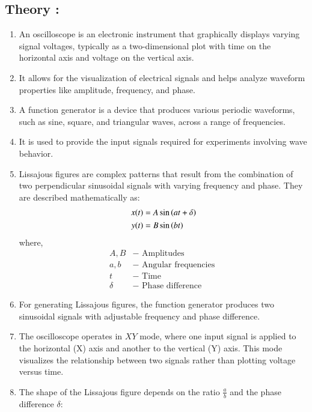 \documentclass[report]{IEEEtran}
\begin{document}
\subsection{Theory : }
\begin{enumerate}
    \item An \color{blue} oscilloscope \color{black} is an electronic instrument that graphically displays varying signal voltages, typically as a two-dimensional plot with time on the horizontal axis and voltage on the vertical axis. 
    \item It allows for the visualization of electrical signals and helps analyze waveform properties like amplitude, frequency, and phase.
    \item A \color{blue} function generator \color{black} is a device that produces various periodic waveforms, such as sine, square, and triangular waves, across a range of frequencies. 
    \item It is used to provide the input signals required for experiments involving wave behavior.
    \item \color{blue} Lissajous figures \color{black} are complex patterns that result from the combination of two perpendicular sinusoidal signals with varying frequency and phase. They are described mathematically as:
    \begin{align}
        x(t) &= A \sin \left(at + \delta\right) \\
        y(t) &= B \sin \left(bt\right)
    \end{align}
    where, 
    \begin{align*}
        A, B &- \text{ Amplitudes } \\
        a, b &- \text{ Angular frequencies } \\
        t &- \text{ Time }\\
        \delta &- \text{ Phase difference }
    \end{align*}
    \item For generating Lissajous figures, the function generator produces two sinusoidal signals with adjustable frequency and phase difference.
    \item The oscilloscope operates in $XY$ mode, where one input signal is applied to the horizontal (X) axis and another to the vertical (Y) axis. This mode visualizes the relationship between two signals rather than plotting voltage versus time.
    \item The shape of the Lissajous figure depends on the ratio \( \frac{a}{b} \) and the phase difference \( \delta \):


\end{enumerate}
\end{document}
